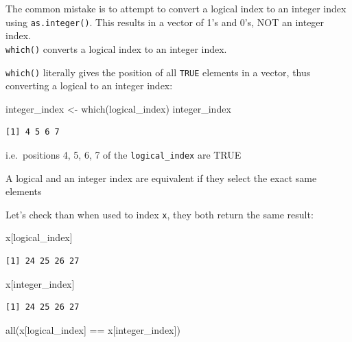 \documentclass[
]{book}
\makeatletter
\newenvironment{Shaded}{\begin{snugshade}}{\end{snugshade}}
\newcommand{\FunctionTok}[1]{\textcolor[rgb]{0.00,0.00,0.00}{#1}}
\newcommand{\NormalTok}[1]{#1}
\newcommand{\OtherTok}[1]{\textcolor[rgb]{0.56,0.35,0.01}{#1}}
\newcommand{\SpecialCharTok}[1]{\textcolor[rgb]{0.00,0.00,0.00}{#1}}
\newenvironment{kframe}{%
\medskip{}
\setlength{\fboxsep}{.8em}
 \def\at@end@of@kframe{}%
 \ifinner\ifhmode%
  \def\at@end@of@kframe{\end{minipage}}%
  \begin{minipage}{\columnwidth}%
 \fi\fi%
 \def\FrameCommand##1{\hskip\@totalleftmargin \hskip-\fboxsep
 \colorbox{shadecolor}{##1}\hskip-\fboxsep
     \hskip-\linewidth \hskip-\@totalleftmargin \hskip\columnwidth}%
 \MakeFramed {\advance\hsize-\width
   \@totalleftmargin\z@ \linewidth\hsize
   \@setminipage}}%
 {\par\unskip\endMakeFramed%
 \at@end@of@kframe}
\newenvironment{rmdblock}[1]
  {
  \begin{itemize}
  \renewcommand{\labelitemi}{
    \raisebox{-.7\height}[0pt][0pt]{
      {\setkeys{Gin}{width=3em,keepaspectratio}\texttt{[image: images/\#1]}}
    }
  }
  \setlength{\fboxsep}{1em}
  \begin{kframe}
  \item
  }
  {
  \end{kframe}
  \end{itemize}
  }
\newenvironment{note}
  {\begin{rmdblock}{note}}
  {\end{rmdblock}}
\newenvironment{warning}
  {\begin{rmdblock}{warning}}
  {\end{rmdblock}}
\makeatother
\begin{document}
\begin{warning}
The common mistake is to attempt to convert a logical index to an
integer index using \texttt{as.integer()}. This results in a vector of
1's and 0's, NOT an integer index.\\
\texttt{which()} converts a logical index to an integer index.
\end{warning}

\texttt{which()} literally gives the position of all \texttt{TRUE} elements in a vector, thus converting a logical to an integer index:

\begin{Shaded}
\begin{Highlighting}[]
\NormalTok{integer\_index }\OtherTok{\textless{}{-}} \FunctionTok{which}\NormalTok{(logical\_index)}
\NormalTok{integer\_index}
\end{Highlighting}
\end{Shaded}

\begin{verbatim}
[1] 4 5 6 7
\end{verbatim}

i.e.~positions 4, 5, 6, 7 of the \texttt{logical\_index} are TRUE

\begin{note}
A logical and an integer index are equivalent if they select the exact
same elements
\end{note}

Let's check than when used to index \texttt{x}, they both return the same result:

\begin{Shaded}
\begin{Highlighting}[]
\NormalTok{x[logical\_index]}
\end{Highlighting}
\end{Shaded}

\begin{verbatim}
[1] 24 25 26 27
\end{verbatim}

\begin{Shaded}
\begin{Highlighting}[]
\NormalTok{x[integer\_index]}
\end{Highlighting}
\end{Shaded}

\begin{verbatim}
[1] 24 25 26 27
\end{verbatim}

\begin{Shaded}
\begin{Highlighting}[]
\FunctionTok{all}\NormalTok{(x[logical\_index] }\SpecialCharTok{==}\NormalTok{ x[integer\_index])}
\end{Highlighting}
\end{Shaded}
\end{document}
